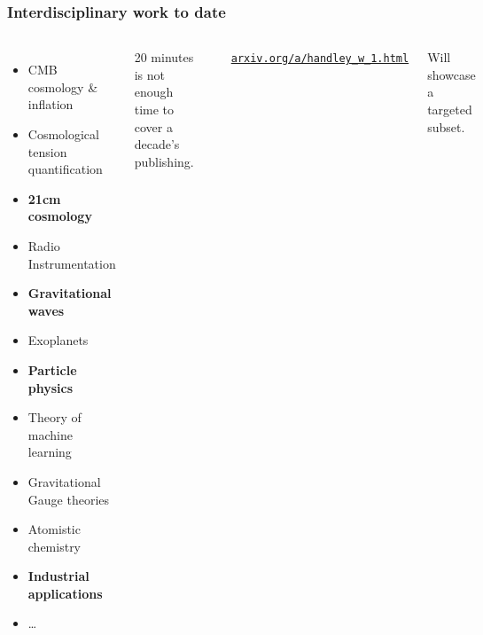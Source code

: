 \documentclass[aspectratio=169]{beamer}
\begin{document}
\begin{frame}
    \frametitle{Interdisciplinary work to date}
    \begin{columns}
        \begin{itemize}
            \item CMB cosmology \& inflation
            \item Cosmological tension quantification
            \item \textbf{21cm cosmology}
            \item Radio Instrumentation
            \item \textbf{Gravitational waves}
            \item Exoplanets
            \item \textbf{Particle physics}
            \item Theory of machine learning
            \item Gravitational Gauge theories
            \item Atomistic chemistry
            \item \textbf{Industrial applications}
            \item \ldots
        \end{itemize}
        20 minutes is not enough time to cover a decade's publishing.

        \vspace{10pt}

        \includegraphics[width=\textwidth]{figures/publishing.png}

        \hfill\textcolor{C0}{\texttt{\href{https://arxiv.org/a/handley_w_1.html}{arxiv.org/a/handley\_w\_1.html}}} 

        Will showcase a targeted subset.
    \end{columns}
\end{frame}
\end{document}
